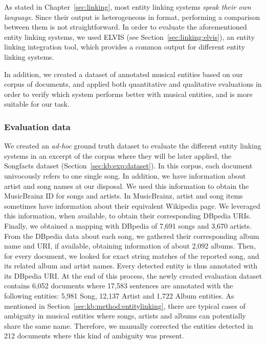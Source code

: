 As stated in Chapter~\ref{sec:linking}, most entity linking systems \textit{speak their own language}. Since their output is heterogeneous in format, performing a comparison between them is not straightforward. In order to evaluate the aforementioned entity linking systems, we used \textsc{ELVIS} (see Section~\ref{sec:linking:elvis}), an entity linking integration tool, which provides a common output for different entity linking systems.

In addition, we created a dataset of annotated musical entities based on our corpus of documents, and applied both quantitative and qualitative evaluations in order to verify which system performs better with musical entities, and is more suitable for our task.



\subsubsection{Evaluation data}

We created an \textit{ad-hoc} ground truth dataset to evaluate the different entity linking systems in an excerpt of the corpus where they will be later applied, the Songfacts dataset (Section~\ref{sec:kb:exp:dataset}). In this corpus, each document univocously refers to one single song. In addition, we have information about artist and song names at our disposal. We used this information to obtain the MusicBrainz ID for songs and artists. In MusicBrainz, artist and song items sometimes have information about their equivalent Wikipedia page. We leveraged this information, when available, to obtain their corresponding DBpedia URIs. Finally, we obtained a mapping with DBpedia of 7,691 songs and 3,670 artists. From the DBpedia data about each song, we gathered their corresponding album name and URI, if available, obtaining information of about 2,092 albums. Then, for every document, we looked for exact string matches of the reported song, and its related album and artist names. Every detected entity is thus annotated with its DBpedia URI. At the end of this process, the newly created evaluation dataset contains 6,052 documents where 17,583 sentences are annotated with the following entities: 5,981 Song, 12,137 Artist and 1,722 Album entities. As mentioned in Section~\ref{sec:kb:method:entitylinking}, there are typical cases of ambiguity in musical entities where songs, artists and albums can potentially share the same name. Therefore, we manually corrected the entities detected in 212 documents where this kind of ambiguity was present.


